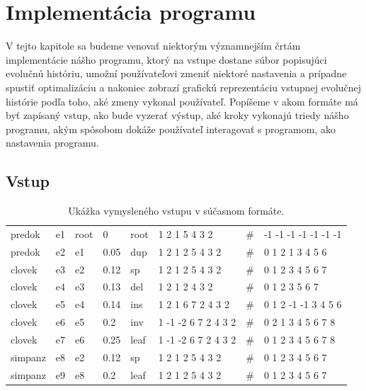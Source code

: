 \chapter{Implementácia programu}
V tejto kapitole sa budeme venovať niektorým významnejším črtám implementácie nášho programu, ktorý na vstupe dostane súbor popisujúci evolučnú históriu,
umožní používateľovi zmeniť niektoré nastavenia a prípadne spustiť optimalizáciu a nakoniec zobrazí grafickú reprezentáciu vstupnej evolučnej histórie podľa
toho, aké zmeny vykonal používateľ. Popíšeme v akom formáte má byť zapísaný vstup,
ako bude vyzerať výstup, aké kroky vykonajú triedy nášho programu,
akým spôsobom dokáže používateľ interagovať s programom,
ako nastavenia programu.
\section{Vstup}
\label{sec:vstup}

\begin{table}[!htb]
\label{tab:vstup}
\begin{center}
\begin{tabular}{llllllll}
predok & e1 & root & 0 & root & 1 2 1 5 4 3 2 & \#  & -1 -1 -1 -1 -1 -1 -1 \\
predok & e2 & e1 &  0.05 & dup &  1 2 1 2 5 4 3 2 & \# & 0 1 2 1 3 4 5 6 \\
clovek & e3 & e2 &  0.12 & sp &   1 2 1 2 5 4 3 2 & \# & 0 1 2 3 4 5 6 7 \\
clovek & e4 & e3 &  0.13 & del & 1 2 1 2 4 3 2 & \# & 0 1 2 3 5 6 7 \\
clovek & e5 & e4 &  0.14 & ins & 1 2 1 6 7 2 4 3 2 & \# & 0 1 2 -1 -1 3 4 5 6 \\
clovek &  e6 & e5 &  0.2 & inv &  1 -1 -2 6 7 2 4 3 2 & \# & 0 2 1 3 4 5 6 7 8 \\
clovek & e7 & e6 &  0.25 & leaf & 1 -1 -2 6 7 2 4 3 2 & \# & 0 1 2 3 4 5 6 7 8 \\
simpanz & e8 & e2  & 0.12 & sp &  1 2 1 2 5 4 3 2 & \# & 0 1 2 3 4 5 6 7 \\
simpanz & e9 & e8 &  0.2 & leaf & 1 2 1 2 5 4 3 2 & \# & 0 1 2 3 4 5 6 7 \\
 \end{tabular}

\end{center}
\caption{Ukážka vymysleného vstupu v súčasnom formáte.}
\end{table}

